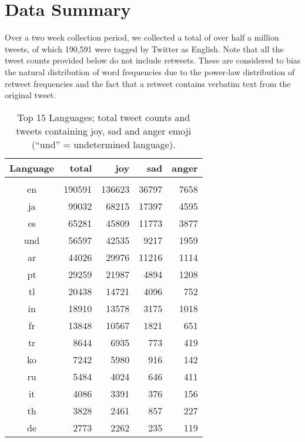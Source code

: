 \documentclass[10pt, a4paper]{article}
\begin{document}
\section{Data Summary}
Over a two week collection period, we collected a total of over half a million tweets, of which 190,591 were tagged by Twitter as English.
Note that all the tweet counts provided below do not include retweets. 
These are considered to bias the natural distribution of word frequencies due to the power-law distribution of retweet frequencies and the fact that a retweet contains verbatim text from the original tweet.


\begin{table}
	\begin{tabular}{crrrr}
Language & total & joy & sad & anger \\
	\hline \\
en  & 190591 & 136623 & 36797 & 7658 \\
ja  & 99032 & 68215 & 17397 & 4595 \\
es  & 65281 & 45809 & 11773 & 3877 \\
und  & 56597 & 42535 & 9217 & 1959 \\
ar  & 44026 & 29976 & 11216 & 1114 \\
pt  & 29259 & 21987 & 4894 & 1208 \\
tl  & 20438 & 14721 & 4096 & 752 \\
in  & 18910 & 13578 & 3175 & 1018 \\
fr  & 13848 & 10567 & 1821 & 651 \\
tr  & 8644 & 6935 & 773 & 419 \\
ko  & 7242 & 5980 & 916 & 142 \\
ru  & 5484 & 4024 & 646 & 411 \\
it  & 4086 & 3391 & 376 & 156 \\
th  & 3828 & 2461 & 857 & 227 \\
de  & 2773 & 2262 & 235 & 119 \\
	\end{tabular}
	\caption{Top 15 Languages; total tweet counts and tweets containing joy, sad and anger emoji  (``und'' = undetermined language).}
	\label{tbl:top-ten-langs}
\end{table}
\end{document}

